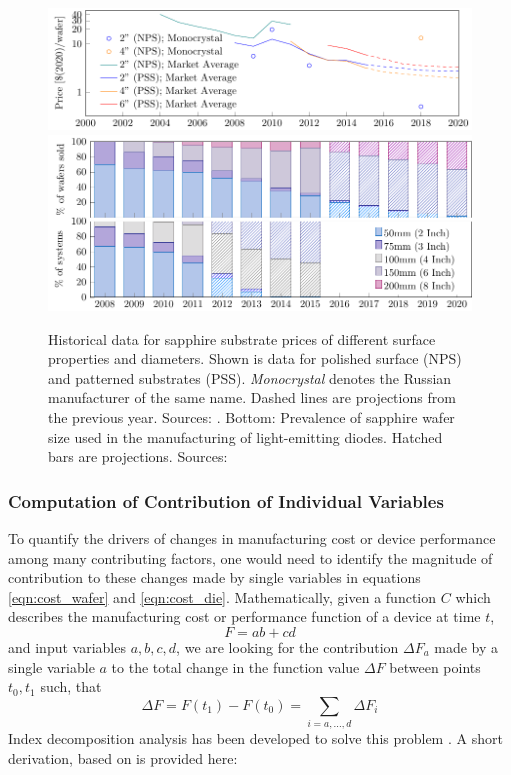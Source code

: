 \documentclass[parskip=full]{article}
\begin{document}
\begin{figure}[h!]
    \includegraphics[width=15cm]{./figures/sapphire_prices.pdf}
    \includegraphics[width=14.5cm]{./figures/wafer_size.pdf}
	\caption{Historical data for sapphire substrate prices of different surface properties and diameters. Shown is data for polished surface (NPS) and patterned substrates (PSS). \textit{Monocrystal} denotes the Russian manufacturer of the same name. Dashed lines are projections from the previous year. Sources: \cite{monocrystal2020private}\cite{yole2011sapphire}\cite{yole2015sapphire}. Bottom: Prevalence of sapphire wafer size used in the manufacturing of light-emitting diodes. Hatched bars are projections. Sources: \cite{veeco2013}\cite{Scholand2012}\cite{yole2015sapphire}}
	\label{fig:wafers}
\end{figure}

\subsubsection{Computation of Contribution of Individual Variables}
\label{sec:contribution_variables}

To quantify the drivers of changes in manufacturing cost or device performance among many contributing factors, one would need to identify the magnitude of contribution to these changes made by single variables in equations \cref{eqn:cost_wafer} and \cref{eqn:cost_die}. Mathematically, given a function $C$ which describes the manufacturing cost or performance function of a device at time $t$,
%
\begin{equation}
F=ab+cd
\end{equation}
%
and input variables $a,b,c,d$, we are looking for the contribution $\Delta F_{a}$ made by a single variable $a$ to the total change in the function value $\Delta F$ between points $t_0,t_1$ such, that
%
\begin{equation}
\Delta F = F(t_1)-F(t_0) = \sum_{i=a, \dots, d} \Delta F_i
\end{equation}
%
Index decomposition analysis has been developed to solve this problem \cite{Boyd1987}. A short derivation, based on \cite{kavlak2018evaluating} is provided here:
\end{document}

